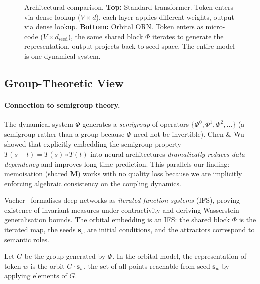 \documentclass[11pt, a4paper]{article}
\newcommand{\M}{\mathbf{M}}
\newcommand{\s}{\mathbf{s}}
\newcommand{\bigO}{\mathcal{O}}
\theoremstyle{remark}
\begin{document}
\begin{figure}[h]
\caption{Architectural comparison.
\textbf{Top:} Standard transformer.
Token enters via dense lookup ($V \times d$), each layer applies different weights, output via dense lookup.
\textbf{Bottom:} Orbital ORN.
Token enters as micro-code ($V \times d_{\text{seed}}$), the same shared block $\Phi$ iterates to generate the representation, output projects back to seed space.
The entire model is one dynamical system.}
\label{fig:arch-comparison}
\end{figure}


\subsection{Group-Theoretic View}

\paragraph{Connection to semigroup theory.}
The dynamical system $\Phi$ generates a \emph{semigroup} of operators $\{\Phi^0, \Phi^1, \Phi^2, \ldots\}$ (a semigroup rather than a group because $\Phi$ need not be invertible).
Chen \& Wu~\cite{chen2023deeposg} showed that explicitly embedding the semigroup property $T(s+t) = T(s) \circ T(t)$ into neural architectures \emph{dramatically reduces data dependency} and improves long-time prediction.
This parallels our finding: memoisation (shared $\M$) works with no quality loss because we are implicitly enforcing algebraic consistency on the coupling dynamics.

Vacher~\cite{vacher2026ifs} formalises deep networks as \emph{iterated function systems} (IFS), proving existence of invariant measures under contractivity and deriving Wasserstein generalisation bounds.
The orbital embedding is an IFS: the shared block $\Phi$ is the iterated map, the seeds $\s_w$ are initial conditions, and the attractors correspond to semantic roles.

Let $G$ be the group generated by $\Phi$.
In the orbital model, the representation of token $w$ is the orbit $G \cdot \s_w$, the set of all points reachable from seed $\s_w$ by applying elements of $G$.
\end{document}
